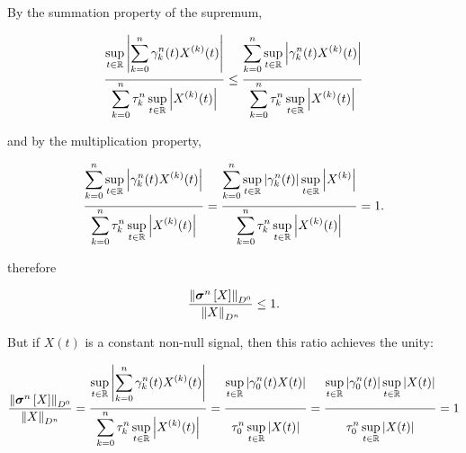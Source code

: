 	By the summation property of the supremum,

\begin{equation} \xfrac{5mm}{3mm}{\displaystyle \sup\limits_{t\in\mathbb{R}}\left\lvert\sum\limits_{k=0}^n \gamma_k^n (t) X^{(k)}(t)\right\rvert }{\displaystyle \sum\limits_{k=0}^n \tau_k^n \sup\limits_{t\in\mathbb{R}}\left\lvert X^{(k)}(t)\right\rvert } \leq \xfrac{5mm}{3mm}{\displaystyle \sum\limits_{k=0}^n \sup\limits_{t\in\mathbb{R}}\left\lvert\gamma_k^n (t) X^{(k)}(t)\right\rvert }{\displaystyle \sum\limits_{k=0}^n \tau_k^n \sup\limits_{t\in\mathbb{R}}\left\lvert X^{(k)}(t)\right\rvert } \end{equation}

	\noindent and by the multiplication property,

\begin{equation} \xfrac{5mm}{3mm}{\displaystyle \sum\limits_{k=0}^n \sup\limits_{t\in\mathbb{R}}\left\lvert\gamma_k^n(t) X^{(k)}(t)\right\rvert }{\displaystyle \sum\limits_{k=0}^n \tau_k^n \sup\limits_{t\in\mathbb{R}}\left\lvert X^{(k)}(t)\right\rvert } = \xfrac{5mm}{3mm}{\displaystyle \sum\limits_{k=0}^n \sup\limits_{t\in\mathbb{R}}\left\lvert\gamma_k^n(t) \right\rvert \sup\limits_{t\in\mathbb{R}}\left\lvert X^{(k)}\right\rvert }{\displaystyle \sum\limits_{k=0}^n \tau_k^n \sup\limits_{t\in\mathbb{R}}\left\lvert X^{(k)}(t)\right\rvert } = 1. \end{equation}

	\noindent therefore

\begin{equation} \dfrac{\left\lVert \boldsymbol{\sigma}^{n}\left[X\right]\right\rVert_{D^0}}{\left\lVert X\right\rVert_{D^n}} \leq 1 .\end{equation}

	But if $X(t)$ is a constant non-null signal, then this ratio achieves the unity:

\begin{equation} \dfrac{\left\lVert \ndpo{n}\left[X\right]\right\rVert_{D^0}}{\left\lVert X\right\rVert_{D^n}} = \xfrac{5mm}{3mm}{\displaystyle \sup\limits_{t\in\mathbb{R}}\left\lvert\sum\limits_{k=0}^n \gamma_k^n (t)X^{(k)}(t)\right\rvert }{\displaystyle \sum\limits_{k=0}^n \tau_k^n \sup\limits_{t\in\mathbb{R}}\left\lvert X^{(k)}(t)\right\rvert } = \xfrac{5mm}{3mm}{\displaystyle \sup\limits_{t\in\mathbb{R}}\left\lvert \gamma_0^n (t)X(t)\right\rvert }{\displaystyle \tau_0^n \sup\limits_{t\in\mathbb{R}}\left\lvert X(t)\right\rvert } = \xfrac{5mm}{3mm}{\displaystyle \sup\limits_{t\in\mathbb{R}}\left\lvert \gamma_0^n (t)\right\rvert \sup\limits_{t\in\mathbb{R}}\left\lvert X(t)\right\rvert }{\displaystyle \tau_0^n \sup\limits_{t\in\mathbb{R}}\left\lvert X(t)\right\rvert } = 1\end{equation}


